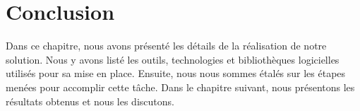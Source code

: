 \section{Conclusion}%
\label{sec.realisation.conclusion}

Dans ce chapitre, nous avons présenté les détails de la réalisation de notre solution.
Nous y avons listé les outils, technologies et bibliothèques logicielles utilisés pour sa mise en place.
Ensuite, nous nous sommes étalés sur les étapes menées pour accomplir cette tâche.
Dans le chapitre suivant, nous présentons les résultats obtenus et nous les discutons.

